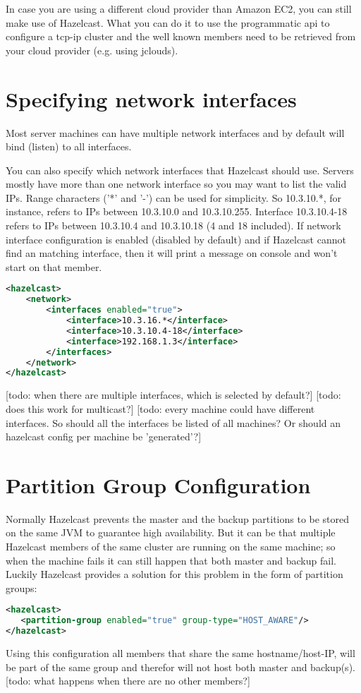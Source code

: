 In case you are using a different cloud provider than Amazon EC2, you can still make use of Hazelcast. What you can do it to use the programmatic api to configure a tcp-ip cluster and the well known members need to be retrieved from your cloud provider (e.g. using jclouds).

\section{Specifying network interfaces}
Most server machines can have multiple network interfaces and by default will bind (listen) to all interfaces.

You can also specify which network interfaces that Hazelcast should use. Servers mostly have more than one network interface so you may want to list the valid IPs. Range characters ('*' and '-') can be used for simplicity. So 10.3.10.*, for instance, refers to IPs between 10.3.10.0 and 10.3.10.255. Interface 10.3.10.4-18 refers to IPs between 10.3.10.4 and 10.3.10.18 (4 and 18 included). If network interface configuration is enabled (disabled by default) and if Hazelcast cannot find an matching interface, then it will print a message on console and won't start on that member.

\begin{lstlisting}[language=xml]
<hazelcast>
    <network>
        <interfaces enabled="true">
            <interface>10.3.16.*</interface> 
            <interface>10.3.10.4-18</interface> 
            <interface>192.168.1.3</interface>         
        </interfaces>    
    </network>
</hazelcast>
\end{lstlisting}

[todo: when there are multiple interfaces, which is selected by default?]
[todo: does this work for multicast?]
[todo: every machine could have different interfaces. So should all the interfaces be listed of all machines? Or should an hazelcast config per machine be 'generated'?]

\section{Partition Group Configuration}
Normally Hazelcast prevents the master and the backup partitions to be stored on the same JVM to guarantee high availability. But it can be that multiple Hazelcast members of the same cluster are running on the same machine; so when the machine fails it can still happen that both master and backup fail. Luckily Hazelcast provides a solution for this problem in the form of partition groups:
\begin{lstlisting}[language=xml]
<hazelcast>
   <partition-group enabled="true" group-type="HOST_AWARE"/>
</hazelcast>
\end{lstlisting}
Using this configuration all members that share the same hostname/host-IP, will be part of the same group and therefor will not host both master and backup(s). [todo: what happens when there are no other members?] 


